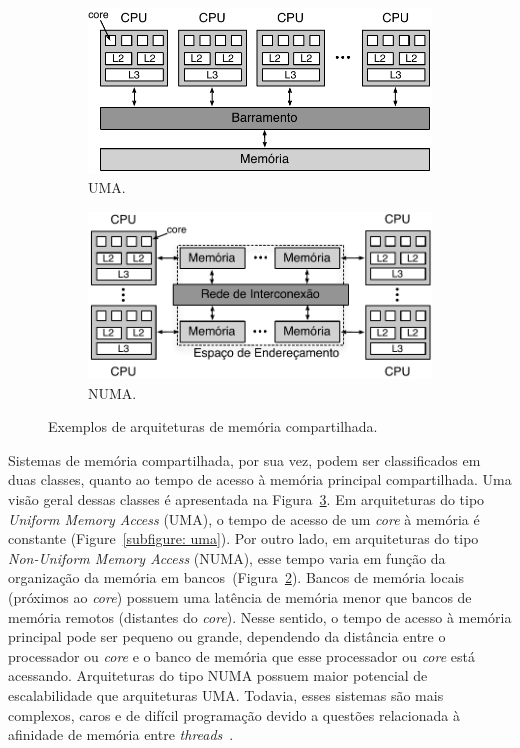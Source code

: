 \documentclass{SBCbookchapter}
\begin{document}
		\begin{figure}[t]
			\captionsetup[subfigure]{justification=centering}
			\centering
				\begin{subfigure}{0.45\linewidth}
					\includegraphics[width=\linewidth]{img/uma}
					\caption{UMA.}
					\label{subfigure: uma}
				\end{subfigure}
				\quad\quad
				\begin{subfigure}{0.45\linewidth}
					\includegraphics[width=\linewidth]{img/numa}
					\caption{NUMA.}
					\label{subfigure: numa}
				\end{subfigure}
			\caption{Exemplos de arquiteturas de memória compartilhada.}
			\label{fig:uma-numa}
		\end{figure}

		Sistemas de memória compartilhada, por sua vez, podem ser
		classificados em duas classes, quanto ao tempo de acesso à
		memória principal compartilhada. Uma visão geral dessas classes
		é apresentada na Figura~\ref{fig:uma-numa}. Em arquiteturas do
		tipo \textit{Uniform Memory Access} (UMA), o tempo de acesso de
		um \textit{core} à memória é constante (Figure~\ref{subfigure:
		uma}). Por outro lado, em arquiteturas do tipo
		\textit{Non-Uniform Memory Access} (NUMA), esse tempo varia em
		função da organização da memória em
		bancos~(Figura~\ref{subfigure: numa}). Bancos de memória locais
		(próximos ao \textit{core}) possuem uma latência de memória
		menor que bancos de memória remotos (distantes do
		\textit{core}).  Nesse sentido, o tempo de acesso à memória
		principal pode ser pequeno ou grande, dependendo da distância
		entre o processador ou \textit{core} e o banco de memória que
		esse processador ou \textit{core} está acessando.  Arquiteturas
		do tipo NUMA possuem maior potencial de escalabilidade que
		arquiteturas UMA. Todavia, esses sistemas são mais
		complexos, caros e de difícil programação devido a questões
		relacionada à afinidade de memória entre
		\textit{threads}~\cite{Pousa-SBAC-2009}.
\end{document}
